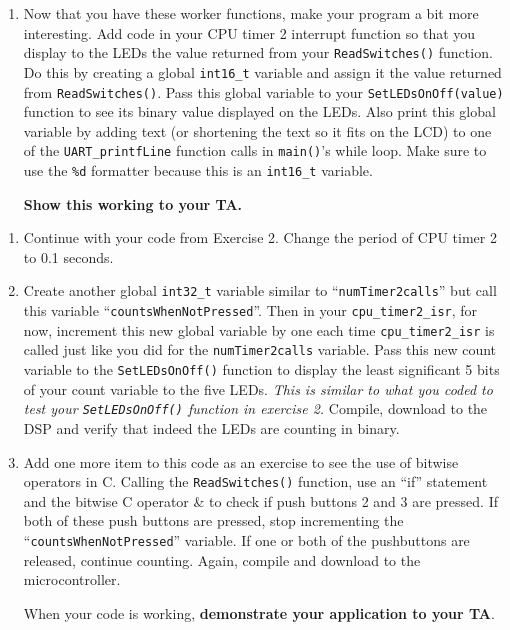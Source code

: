 \documentclass[11pt]{article}
\begin{document}
\begin{enumerate}
\begin{itemize}
        \end{itemize}
        \item Now that you have these worker functions, make your program a bit more interesting. Add code in your CPU timer 2 interrupt function so that you display to the LEDs the value returned from your \texttt{ReadSwitches()} function. Do this by creating a global \texttt{int16_t} variable and assign it the value returned from \texttt{ReadSwitches()}. Pass this global variable to your \texttt{SetLEDsOnOff(value)} function to see its binary value displayed on the LEDs. Also print this global variable by adding text (or shortening the text so it fits on the LCD) to one of the \texttt{UART_printfLine} function calls in \texttt{main()}’s while loop. Make sure to use the \texttt{\%d} formatter because this is an \texttt{int16_t} variable.
        \begin{checkoff}
                \textbf{Show this working to your TA.}
        \end{checkoff}
\end{enumerate}
%
\Ex
%
\begin{enumerate}
    \item Continue with your code from Exercise 2. Change the period of CPU timer 2 to 0.1 seconds.
        \item Create another global \texttt{int32_t} variable similar to “\texttt{numTimer2calls}” but call this variable “\texttt{countsWhenNotPressed}”. Then in your \texttt{cpu_timer2_isr}, for now, increment this new global variable by one each time \texttt{cpu_timer2_isr} is called just like you did for the \texttt{numTimer2calls} variable. Pass this new count variable to the \texttt{SetLEDsOnOff()} function to display the least significant 5 bits of your count variable to the five LEDs. {\itshape This is similar to what you coded to test your \texttt{SetLEDsOnOff()} function in exercise 2.} Compile, download to the DSP and verify that indeed the LEDs are counting in binary.
        \item Add one more item to this code as an exercise to see the use of bitwise operators in C. Calling the \texttt{ReadSwitches()} function, use an “if” statement and the bitwise C operator \& to check if push buttons 2 and 3 are pressed. If both of these push buttons are pressed, stop incrementing the “\texttt{countsWhenNotPressed}” variable. If one or both of the pushbuttons are released, continue counting. Again, compile and download to the microcontroller.
        \begin{checkoff}
                When your code is working, \textbf{demonstrate your application to your TA}.
        \end{checkoff}
\end{enumerate}
%
\end{document}
